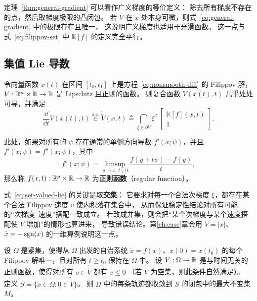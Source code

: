 定理~\ref{thm:general-gradient} 可以看作广义梯度的等价定义：
除去所有梯度不存在的点，然后取梯度极限的凸闭包。
若 $V$ 在 $x$ 处本身可微，则式~\eqref{eq:general-gradient} 中的极限存在且唯一，
这说明广义梯度也适用于光滑函数。
这一点与式~\eqref{eq:filippov-set} 中 $\mathbb{K}[f]$ 的定义完全平行。

\subsection{集值 Lie 导数}

\begin{theorem}[集值 Lie 导数]\label{thm:set-valued-lie}
  \cite{shevitzLyapunovStabilityTheory1994}
  令向量函数 $x(t)$ 在区间 $[t_0,t_1]$ 上是方程~\eqref{eq:nonsmooth-diff} 的 Filippov 解，
  $V:\mathbb{R}^n\times\mathbb{R}\to\mathbb{R}$ 是 Lipschitz 且正则的函数。
  则复合函数 $V(x(t),t)$ 几乎处处可导，并满足
  \begin{equation}\label{eq:set-valued-lie}
    \frac{\dd}{\dd t}V(x(t),t)\overset{\text{a.e.}}{\in}
    \dot{\tilde{V}}(x,t)\triangleq
    \bigcap_{\xi\in\partial V}\xi^\top
    \begin{bmatrix}
      \mathbb{K}[f](x,t)\\1
    \end{bmatrix}.
  \end{equation}
\end{theorem}

此处，如果对所有的 $\psi$ 存在通常的单侧方向导数 $f'(x;\psi)$，并且 $f'(x;\psi)=f^o(x;\psi)$，其中
\begin{equation*}
  f^o(x;\psi)=\limsup_{y\to x,\ t\downarrow0}\frac{f(y+t\psi)-f(y)}{t},
\end{equation*}
那么称 $f(x,t):\mathbb{R}^p\times\mathbb{R}\to\mathbb{R}$ 为\textbf{正则函数}（regular function）。

\begin{remark}[交集而不是并集]
  式~\eqref{eq:set-valued-lie} 的关键是取\textbf{交集}：
  它要求对每一个合法次梯度 $\xi$，都存在某个合法 Filippov 速度 $v$ 使内积落在集合中，
  从而保证稳定性结论对所有可能的“次梯度--速度”搭配一致成立。
  若改成并集，则会把“某个次梯度与某个速度搭配使 $V$ 增加”的情形也算进来，
  导致错误结论。第\ref{ch:case}章会用 $V=|x|$、$\dot x=-\operatorname{sgn}(x)$ 的一维算例说明这一点。
\end{remark}

\begin{theorem}\label{thm:LaSalle}
  \cite[Theorem 3.2]{shevitzLyapunovStabilityTheory1994}
  设 $\Omega$ 是紧集，使得从 $\Omega$ 出发的自治系统 $\dot{x}=f(x)$、$x(0)=x(t_0)$ 的每个 Filippov 解唯一，且对所有 $t\ge t_0$ 保持在 $\Omega$ 中。
  设 $V:\Omega\to\mathbb{R}$ 是与时间无关的正则函数，使得对所有 $v\in\dot{\tilde{V}}$ 都有 $v\le0$
  （若 $\dot{\tilde{V}}$ 为空集，则此条件自然满足）。
  定义 $S=\{x\in\Omega: 0\in\dot{\tilde{V}}\}$。
  则 $\Omega$ 中的每条轨迹都收敛到 $S$ 的闭包中的最大不变集 $M$。
\end{theorem}

